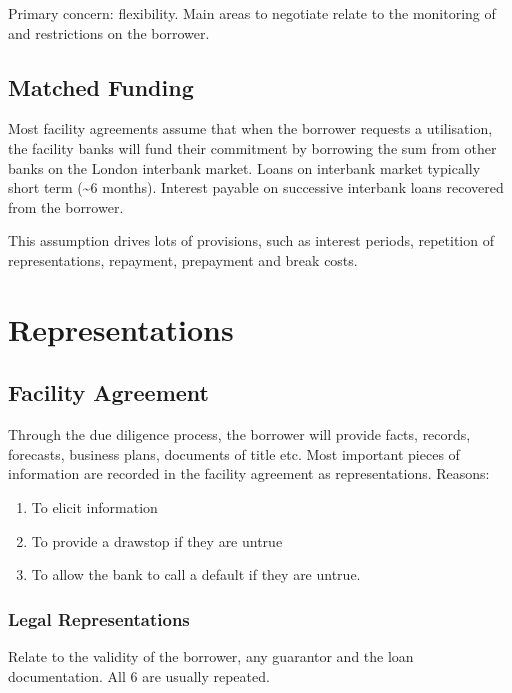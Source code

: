 \documentclass[
]{article}
\providecommand{\tightlist}{%
  \setlength{\itemsep}{0pt}\setlength{\parskip}{0pt}}
\begin{document}
Primary concern: flexibility. Main areas to negotiate relate to the
monitoring of and restrictions on the borrower.

\hypertarget{matched-funding}{%
\subsection{Matched Funding}\label{matched-funding}}

Most facility agreements assume that when the borrower requests a
utilisation, the facility banks will fund their commitment by borrowing
the sum from other banks on the London interbank market. Loans on
interbank market typically short term (\textasciitilde6 months).
Interest payable on successive interbank loans recovered from the
borrower.

This assumption drives lots of provisions, such as interest periods,
repetition of representations, repayment, prepayment and break costs.

\hypertarget{representations}{%
\section{Representations}\label{representations}}

\hypertarget{facility-agreement}{%
\subsection{Facility Agreement}\label{facility-agreement}}

Through the due diligence process, the borrower will provide facts,
records, forecasts, business plans, documents of title etc. Most
important pieces of information are recorded in the facility agreement
as representations. Reasons:

\begin{enumerate}
\tightlist
\item
  To elicit information
\item
  To provide a drawstop if they are untrue
\item
  To allow the bank to call a default if they are untrue.
\end{enumerate}

\hypertarget{legal-representations}{%
\subsubsection{Legal Representations}\label{legal-representations}}

Relate to the validity of the borrower, any guarantor and the loan
documentation. All 6 are usually repeated.
\end{document}
